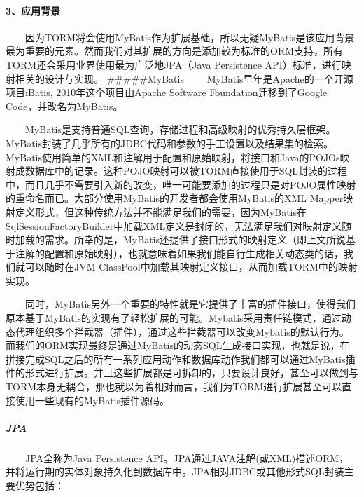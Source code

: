 \documentclass[]{article}
\begin{document}
\paragraph{3、应用背景}\label{ux5e94ux7528ux80ccux666f}

　　因为TORM将会使用MyBatis作为扩展基础，所以无疑MyBatis是该应用背景最为重要的元素。然而我们对其扩展的方向是添加较为标准的ORM支持，所有TORM还会采用业界使用最为广泛地JPA（Java
Persistence API）标准，进行映射相关的设计与实现。 \#\#\#\#\#MyBatis
　　MyBatis早年是Apache的一个开源项目iBatis, 2010年这个项目由Apache
Software Foundation迁移到了Google Code，并改名为MyBatis。

　　MyBatis是支持普通SQL查询，存储过程和高级映射的优秀持久层框架。MyBatis封装了几乎所有的JDBC代码和参数的手工设置以及结果集的检索。MyBatis使用简单的XML和注解用于配置和原始映射，将接口和Java的POJOs映射成数据库中的记录。这种POJO映射可以被TORM直接使用于SQL封装的过程中，而且几乎不需要引入新的改变，唯一可能要添加的过程只是对POJO属性映射的重命名而已。大部分使用MyBatis的开发者都会使用MyBatis的XML
Mapper映射定义形式，但这种传统方法并不能满足我们的需要，因为MyBatis在SqlSessionFactoryBuilder中加载XML定义是封闭的，无法满足我们对映射定义随时加载的需求。所幸的是，MyBatis还提供了接口形式的映射定义（即上文所说基于注解的配置和原始映射），也就意味着如果我们能自行生成相关动态类的话，我们就可以随时在JVM
ClassPool中加载其映射定义接口，从而加载TORM中的映射实现。

　　同时，MyBatis另外一个重要的特性就是它提供了丰富的插件接口，使得我们原本基于MyBatis的实现有了轻松扩展的可能。Mybatis采用责任链模式，通过动态代理组织多个拦截器（插件），通过这些拦截器可以改变Mybatis的默认行为。而我们的ORM实现最终是通过MyBatis的动态SQL生成接口实现，也就是说，在拼接完成SQL之后的所有一系列应用动作和数据库动作我们都可以通过MyBatis插件的形式进行扩展。并且这些扩展都是可拆卸的，只要设计良好，甚至可以做到与TORM本身无耦合，那也就以为着相对而言，我们为TORM进行扩展甚至可以直接使用一些现有的MyBatis插件源码。

\subparagraph{JPA}\label{jpa}

　　JPA全称为Java Persistence
API。JPA通过JAVA注解(或XML)描述ORM，并将运行期的实体对象持久化到数据库中。JPA相对JDBC或其他形式SQL封装主要优势包括：
\end{document}
